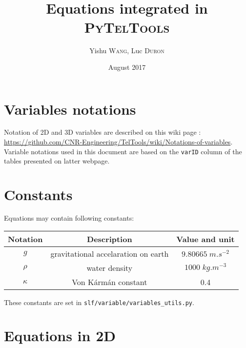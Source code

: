 \documentclass{article}
\title{Equations integrated in \textsc{PyTelTools}}
\author{Yishu \textsc{Wang}, Luc \textsc{Duron}}
\date{August 2017}
\begin{document}
\shorthandoff{:}

\maketitle
\small
\tableofcontents\newpage
\printindex
\normalsize

\section{Variables notations}

Notation of 2D and 3D variables are described on this wiki page : \url{https://github.com/CNR-Engineering/TelTools/wiki/Notations-of-variables}.
Variable notations used in this document are based on the \texttt{varID} column of the tables presented on latter webpage.

\section{Constants}

Equations may contain following constants:

\begin{center}
  \begin{tabular}{ | c | c | c | }
    \hline
    Notation  & Description & Value and unit \\
    \hline
    $g$      & gravitational accelaration on earth & $9.80665 \; m.s^{-2}$ \\
    $\rho$   & water density                       & $1000 \; kg.m^{-3}$ \\
    $\kappa$ & Von Kármán constant                 & 0.4 \\
    \hline
  \end{tabular}
\end{center}

These constants are set in \texttt{slf/variable/variables\_utils.py}.

\section{Equations in 2D}
\end{document}
